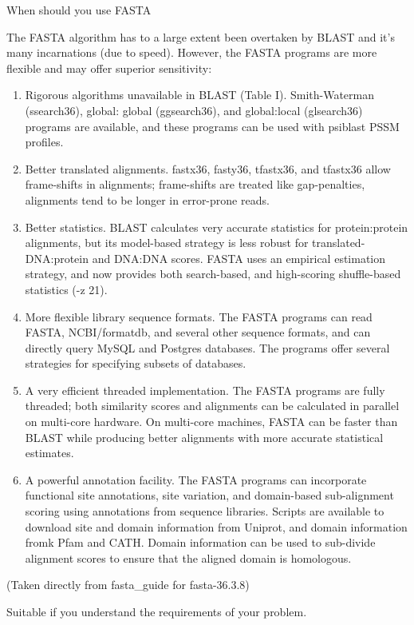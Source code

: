 \documentclass[pdf]{beamer}
\begin{document}
\begin{frame}{When should you use FASTA}

  {\small
  The FASTA algorithm has to a large extent been overtaken by BLAST and it's
  many incarnations (due to speed). However, the FASTA programs are more
  flexible and may offer superior sensitivity:
  }
  {\tiny
    \begin{enumerate}
    \item Rigorous algorithms unavailable in BLAST (Table I). Smith-Waterman
      (ssearch36), global: global (ggsearch36), and global:local (glsearch36)
      programs are available, and these programs can be used with psiblast PSSM profiles.
    \item Better translated alignments. fastx36, fasty36, tfastx36, and tfastx36
      allow frame-shifts in alignments; frame-shifts are treated like gap-penalties,
      alignments tend to be longer in error-prone reads.
    \item Better statistics. BLAST calculates very accurate statistics for
      protein:protein alignments, but its model-based strategy is less robust
      for translated-DNA:protein and DNA:DNA scores. FASTA uses an empirical
      estimation strategy, and now provides both search-based, and
      high-scoring shuffle-based statistics (-z 21).
    \item More flexible library sequence formats. The FASTA programs can read FASTA,
      NCBI/formatdb, and several other sequence formats, and can directly query MySQL and
      Postgres databases. The programs offer several strategies for specifying subsets
      of databases.
    \item A very efficient threaded implementation. The FASTA programs are fully
      threaded; both similarity scores and alignments can be calculated in parallel on multi-core
      hardware. On multi-core machines, FASTA can be faster than BLAST while producing better
      alignments with more accurate statistical estimates.
    \item A powerful annotation facility. The FASTA programs can incorporate
      functional site annotations, site variation, and domain-based sub-alignment scoring using
      annotations from sequence libraries. Scripts are available to download site and domain
      information from Uniprot, and domain information fromk Pfam and
      CATH. Domain information can be used to sub-divide alignment scores to
      ensure that the aligned domain is homologous.
    \end{enumerate}
    (Taken directly from fasta\_guide for fasta-36.3.8)
  }

  \small Suitable if you understand the requirements of your problem.
\end{frame}
\end{document}
